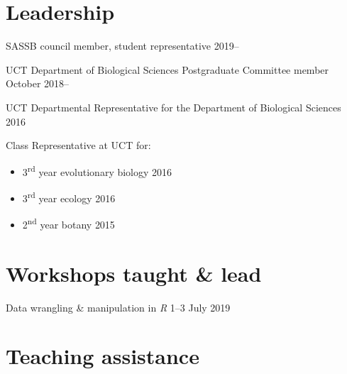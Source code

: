 \documentclass[10pt]{article}
\begin{document}
\section*{Leadership} %

SASSB council member, student representative              \hfill {\small 2019--}

UCT Department of Biological Sciences Postgraduate Committee member
                                                 \hfill {\small  October 2018--}

UCT Departmental Representative for the Department of Biological Sciences
                                                            \hfill {\small 2016}

Class Representative at UCT for:

\begin{itemize}[noitemsep, nolistsep]
  \item 3\textsuperscript{rd} year evolutionary biology     \hfill {\small 2016}
  \item 3\textsuperscript{rd} year ecology                  \hfill {\small 2016}
  \item 2\textsuperscript{nd} year botany                   \hfill {\small 2015}
\end{itemize}

\section*{Workshops taught \& lead} %

Data wrangling \& manipulation in \textit{R}      \hfill {\small 1--3 July 2019}

\section*{Teaching assistance} %

\end{document}
